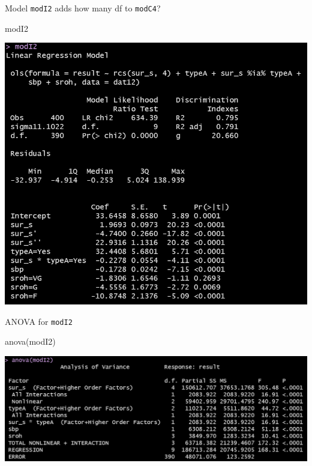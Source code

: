 \documentclass[
  ignorenonframetext,
]{beamer}
\newenvironment{Shaded}{\begin{snugshade}}{\end{snugshade}}
\newcommand{\FunctionTok}[1]{\textcolor[rgb]{0.00,0.00,0.00}{#1}}
\newcommand{\NormalTok}[1]{#1}
\begin{document}
\begin{frame}[fragile]{Model \texttt{modI2} adds how many df to
\texttt{modC4}?}
\protect\hypertarget{model-modi2-adds-how-many-df-to-modc4}{}
\begin{Shaded}
\begin{Highlighting}[]
\NormalTok{modI2}
\end{Highlighting}
\end{Shaded}

\begin{center}\includegraphics[width=11.32in,height=0.65\textheight]{figures/small8} \end{center}
\end{frame}

\begin{frame}[fragile]{ANOVA for \texttt{modI2}}
\protect\hypertarget{anova-for-modi2}{}
\begin{Shaded}
\begin{Highlighting}[]
\FunctionTok{anova}\NormalTok{(modI2)}
\end{Highlighting}
\end{Shaded}

\begin{center}\includegraphics[width=0.85\linewidth]{figures/small8b} \end{center}
\end{frame}
\end{document}
